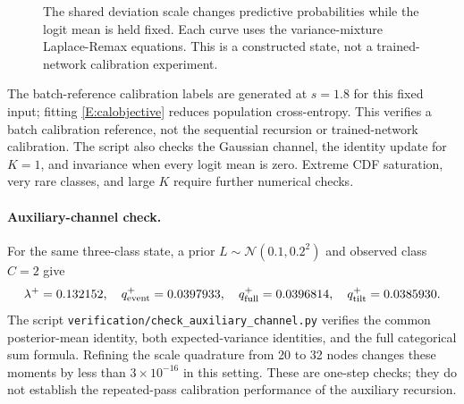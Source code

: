 \documentclass[letterpaper]{article}
\newcommand{\Normal}{\mathcal N}
\begin{document}
\begin{figure}[H]
\caption{The shared deviation scale changes predictive probabilities while the logit mean is held fixed. Each curve uses the variance-mixture Laplace-Remax equations. This is a constructed state, not a trained-network calibration experiment.}
\label{F:scale}
\end{figure}
The batch-reference calibration labels are generated at $s=1.8$ for this fixed input; fitting \eqref{E:calobjective} reduces population cross-entropy. This verifies a batch calibration reference, not the sequential recursion or trained-network calibration. The script also checks the Gaussian channel, the identity update for $K=1$, and invariance when every logit mean is zero. Extreme CDF saturation, very rare classes, and large $K$ require further numerical checks.

\paragraph{Auxiliary-channel check.}
For the same three-class state, a prior $L\sim\Normal(0.1,0.2^2)$ and observed class $C=2$ give
\begin{equation}
\lambda^+=0.132152,\quad q^+_{\rm event}=0.0397933,\quad
q^+_{\rm full}=0.0396814,\quad q^+_{\rm tilt}=0.0385930.
\end{equation}
The script \texttt{verification/check\_auxiliary\_channel.py} verifies the common posterior-mean identity, both expected-variance identities, and the full categorical sum formula. Refining the scale quadrature from 20 to 32 nodes changes these moments by less than $3\times10^{-16}$ in this setting. These are one-step checks; they do not establish the repeated-pass calibration performance of the auxiliary recursion.
\end{document}
